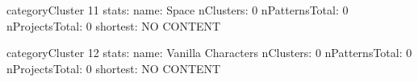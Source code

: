 \begin{multicols}{1}
\begin{description}[noitemsep,topsep=0pt]
categoryCluster 11 stats:
name: Space
nClusters: 0
nPatternsTotal: 0
nProjectsTotal: 0
shortest: NO CONTENT

\end{description}
\end{multicols}



\begin{multicols}{1}
\begin{description}[noitemsep,topsep=0pt]
categoryCluster 12 stats:
name: Vanilla Characters
nClusters: 0
nPatternsTotal: 0
nProjectsTotal: 0
shortest: NO CONTENT

\end{description}
\end{multicols}



